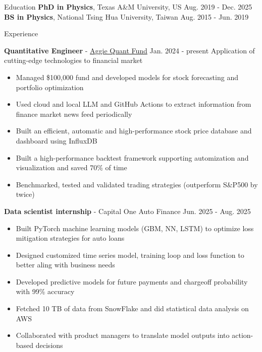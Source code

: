 \documentclass{resume}
\begin{document}
\vspace{-1.5em}
\begin{rSection}{Education}
\vspace{-0.25em}
{\bf PhD in Physics}, Texas A\&M University, US \hfill {Aug. 2019 - Dec. 2025} \\
{\bf BS in Physics}, National Tsing Hua University, Taiwan \hfill {Aug. 2015 - Jun. 2019}
\end{rSection}


\begin{rSection}{Experience}
    \vspace{-1.5em}
    \item \textbf{Quantitative Engineer} - \href{https://www.linkedin.com/company/aggieqf}{Aggie Quant Fund} \hfill Jan. 2024 - present
        \newline\hspace*{0.5em} {\normalsize Application of cutting-edge technologies to financial market}
        \begin{itemize}
        \item Managed \$100,000 fund and developed models for stock forecasting and portfolio optimization
        \item Used cloud and local LLM and GitHub Actions to extract information from finance market news feed periodically
        \item Built an efficient, automatic and high-performance stock price database and dashboard using InfluxDB
        \item Built a high-performance backtest framework supporting automization and visualization and saved 70\% of time
        \item Benchmarked, tested and validated trading strategies (outperform S\&P500 by twice)
        \end{itemize}

    \vspace{0.5em}
    \item \textbf{Data scientist internship} - Capital One Auto Finance \hfill Jun. 2025 - Aug. 2025
        \begin{itemize}
        \item Built PyTorch machine learning models (GBM, NN, LSTM) to optimize loss mitigation strategies for auto loans
        \item Designed customized time series model, training loop and loss function to better aling with business needs
        \item Developed predictive models for future payments and chargeoff probability with 99\% accuracy
        \item Fetched 10 TB of data from SnowFlake and did statistical data analysis on AWS
        \item Collaborated with product managers to translate model outputs into action-based decisions
        \end{itemize}


\end{rSection}
\end{document}
